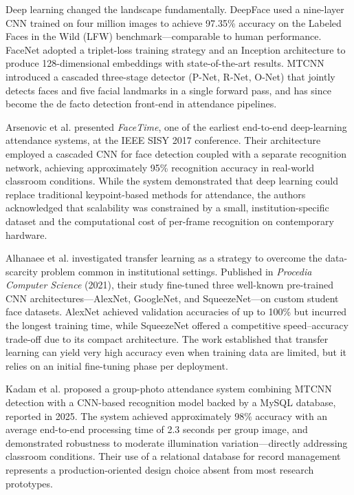 \documentclass[conference]{IEEEtran}
\begin{document}
Deep learning changed the landscape fundamentally. DeepFace \cite{b2}
used a nine-layer CNN trained on four million images to achieve
97.35\% accuracy on the Labeled Faces in the Wild (LFW) benchmark---comparable
to human performance. FaceNet \cite{b3} adopted a triplet-loss training
strategy and an Inception architecture to produce 128-dimensional
embeddings with state-of-the-art results. MTCNN \cite{b4} introduced a
cascaded three-stage detector (P-Net, R-Net, O-Net) that jointly detects
faces and five facial landmarks in a single forward pass, and has since
become the de facto detection front-end in attendance pipelines.

Arsenovic et al. \cite{b10} presented \emph{FaceTime}, one of the earliest
end-to-end deep-learning attendance systems, at the IEEE SISY 2017 conference.
Their architecture employed a cascaded CNN for face detection coupled with a
separate recognition network, achieving approximately 95\% recognition accuracy
in real-world classroom conditions. While the system demonstrated that deep
learning could replace traditional keypoint-based methods for attendance, the
authors acknowledged that scalability was constrained by a small, institution-specific
dataset and the computational cost of per-frame recognition on contemporary hardware.

Alhanaee et al. \cite{b11} investigated transfer learning as a strategy to
overcome the data-scarcity problem common in institutional settings. Published in
\emph{Procedia Computer Science} (2021), their study fine-tuned three well-known
pre-trained CNN architectures---AlexNet, GoogleNet, and SqueezeNet---on custom
student face datasets. AlexNet achieved validation accuracies of up to 100\% but
incurred the longest training time, while SqueezeNet offered a competitive
speed--accuracy trade-off due to its compact architecture. The work established
that transfer learning can yield very high accuracy even when training data are
limited, but it relies on an initial fine-tuning phase per deployment.

Kadam et al. \cite{b12} proposed a group-photo attendance system combining
MTCNN detection with a CNN-based recognition model backed by a MySQL database,
reported in 2025. The system achieved approximately 98\% accuracy with an average
end-to-end processing time of 2.3 seconds per group image, and demonstrated
robustness to moderate illumination variation---directly addressing classroom
conditions. Their use of a relational database for record management represents
a production-oriented design choice absent from most research prototypes.
\end{document}
